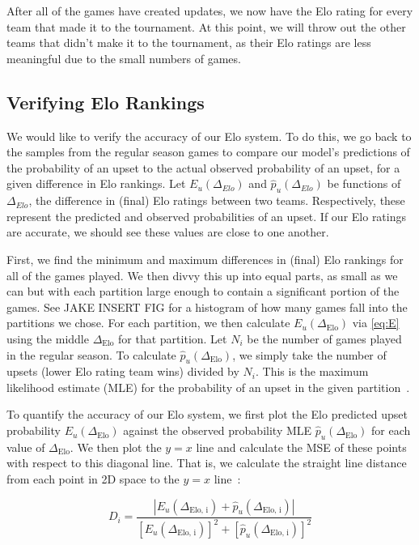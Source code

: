 \documentclass{article}
\begin{document}
After all of the games have created updates, we now have the Elo rating for every team that made it to the tournament. At this point, we will throw out the other teams that didn't make it to the tournament, as their Elo ratings are less meaningful due to the small numbers of games.

\subsection{Verifying Elo Rankings}\label{verify}
We would like to verify the accuracy of our Elo system. To do this, we go back to the samples from the regular season games to compare our model's predictions of the probability of an upset to the actual observed probability of an upset, for a given difference in Elo rankings. Let $E_u(\Delta_{Elo})$ and $\hat{p}_u(\Delta_{Elo})$ be functions of $\Delta_{Elo}$, the difference in (final) Elo ratings between two teams. Respectively, these represent the predicted and observed probabilities of an upset. If our Elo ratings are accurate, we should see these values are close to one another.

First, we find the minimum and maximum differences in (final) Elo rankings for all of the games played. We then divvy this up into equal parts, as small as we can but with each partition large enough to contain a significant portion of the games. See JAKE INSERT FIG for a histogram of how many games fall into the partitions we chose. For each partition, we then calculate $E_u(\Delta_{\text{Elo}})$ via \autoref{eq:E} using the middle $\Delta_{\text{Elo}}$ for that partition. Let $N_i$ be the number of games played in the regular season. To calculate $\hat{p}_u(\Delta_{\text{Elo}})$, we simply take the number of upsets (lower Elo rating team wins) divided by $N_i$. This is the maximum likelihood estimate (MLE) for the probability of an upset in the given partition~\cite{statproofbookMaximumLikelihood}.

To quantify the accuracy of our Elo system, we first plot the Elo predicted upset probability $E_u(\Delta_{\text{Elo}})$ against the observed probability MLE $\hat{p}_u(\Delta_{\text{Elo}})$ for each value of $\Delta_{\text{Elo}}$. We then plot the $y=x$ line and calculate the MSE of these points with respect to this diagonal line. That is, we calculate the straight line distance from each point in 2D space to the $y=x$ line~\cite{enwiki:1235411332}:

\[
D_i = \frac{|E_u(\Delta_{\text{Elo, i}}) + \hat{p}_u(\Delta_{\text{Elo, i}})|}{{[E_u(\Delta_{\text{Elo, i}})]}^2+{[\hat{p}_u(\Delta_{\text{Elo, i}})]}^2}
\]
\end{document}
